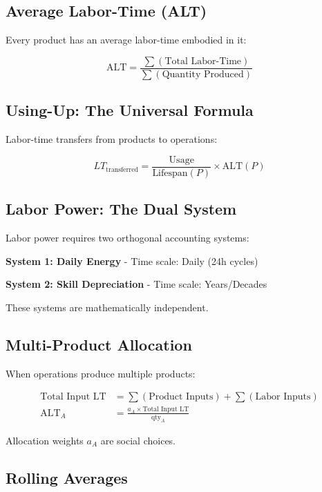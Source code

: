 \documentclass[12pt,a4paper]{article}
\begin{document}
\subsection{Average Labor-Time (ALT)}

Every product has an average labor-time embodied in it:

\begin{equation}
\text{ALT} = \frac{\sum(\text{Total Labor-Time})}{\sum(\text{Quantity Produced})}
\end{equation}

\subsection{Using-Up: The Universal Formula}

Labor-time transfers from products to operations:

\begin{equation}
LT_{\text{transferred}} = \frac{\text{Usage}}{\text{Lifespan}(P)} \times \text{ALT}(P)
\end{equation}

\subsection{Labor Power: The Dual System}

Labor power requires two orthogonal accounting systems:

\textbf{System 1: Daily Energy} - Time scale: Daily (24h cycles)

\textbf{System 2: Skill Depreciation} - Time scale: Years/Decades

These systems are mathematically independent.

\subsection{Multi-Product Allocation}

When operations produce multiple products:

\begin{align}
\text{Total Input LT} &= \sum(\text{Product Inputs}) + \sum(\text{Labor Inputs}) \\
\text{ALT}_A &= \frac{a_A \times \text{Total Input LT}}{\text{qty}_A}
\end{align}

Allocation weights $a_A$ are social choices.

\subsection{Rolling Averages}
\end{document}
